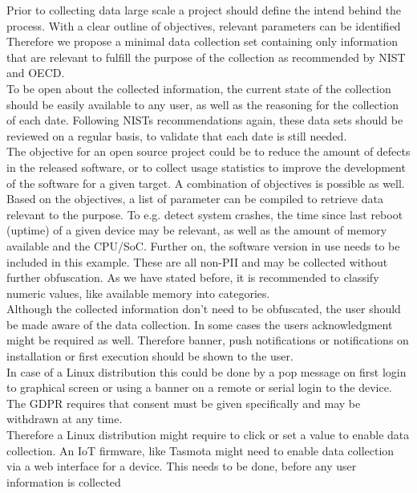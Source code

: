        Prior to collecting data large scale a project should define the intend behind the process. With a clear outline of objectives, relevant parameters can be identified 
        Therefore we propose a minimal data collection set containing only information that are relevant to fulfill the purpose of the collection as recommended by NIST and OECD.\\
        To be open about the collected information, the current state of the collection should be easily available to any user, as well as the reasoning for the collection of each date.
        Following NISTs recommendations again, these data sets should be reviewed on a regular basis, to validate that each date is still needed.\\
        
        The objective for an open source project could be to reduce the amount of defects in the released software, or  to collect usage statistics to improve the development of the software for a given target. A combination of objectives is possible as well.\\
        Based on the objectives, a list of parameter can be compiled to retrieve data relevant to the purpose.
        To e.g. detect system crashes, the time since last reboot (uptime) of a given device may be relevant, as well as the amount of memory available and the CPU/SoC. Further on, the software version in use needs to be included in this example. These are all non-PII and may be collected without further obfuscation. As we have stated before, it is recommended to 
        classify numeric values, like available memory into categories.\\
        
        Although the collected information don't need to be obfuscated, the user should be made aware of the data collection. In some cases the users acknowledgment might be required as well. Therefore banner, push notifications or notifications on installation or first execution should be shown to the user. \\
        In case of a Linux distribution this could be done by a pop message on first login to graphical screen or using a banner on a remote or serial login to the device.
        The GDPR requires that consent must be given specifically and may be withdrawn at any time\cite{noauthor_gdpr_2020}.\\ 
        Therefore a Linux distribution might require to click or set a value to enable data collection. An IoT firmware, like Tasmota might need to enable data collection via a web interface for a device. This needs to be done, before any user information is collected\\ 
        
